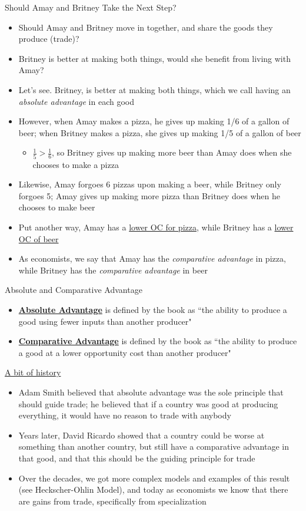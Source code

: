 \documentclass[10pt,xcolor={svgnames}]{beamer}
\begin{document}
\begin{frame}{Should Amay and Britney Take the Next Step?}
\begin{itemize}[<+->]
    \item Should Amay and Britney move in together, and share the goods they produce (trade)?
    \item Britney is better at making both things, would she benefit from living with Amay?
    \item Let's see. Britney, is better at making both things, which we call having an \textit{absolute advantage} in each good 
    \item However, when Amay makes a pizza, he gives up making 1/6 of a gallon of beer; when Britney makes a pizza, she gives up making 1/5 of a gallon of beer
    \begin{itemize}
        \item $\frac{1}{5}>\frac{1}{6}$, so Britney gives up making more beer than Amay does when she chooses to make a pizza
    \end{itemize}
    \item Likewise, Amay forgoes 6 pizzas upon making a beer, while Britney only forgoes 5; Amay gives up making more pizza than Britney does when he chooses to make beer
    \item Put another way, Amay has a \underline{lower OC for pizza}, while Britney has a \underline{lower OC of beer}
    \item As economists, we say that Amay has the \textit{comparative advantage} in pizza, while Britney has the \textit{comparative advantage} in beer
\end{itemize}
\end{frame}

\begin{frame}{Absolute and Comparative Advantage}
\begin{itemize}[<+->]
    \item \underline{\textbf{Absolute Advantage}} is defined by the book as ``the ability to produce a good using fewer inputs than another producer"
    \item \underline{\textbf{Comparative Advantage}} is defined by the book as ``the ability to produce a good at a lower opportunity cost than another producer"
\end{itemize}
    \underline{A bit of history} 
\begin{itemize}
    \item Adam Smith believed that absolute advantage was the sole principle that should guide trade; he believed that if a country was good at producing everything, it would have no reason to trade with anybody
    \item Years later, David Ricardo showed that a country could be worse at something than another country, but still have a comparative advantage in that good, and that this should be the guiding principle for trade
    \item Over the decades, we got more complex models and examples of this result (see Heckscher-Ohlin Model), and today as economists we know that there are gains from trade, specifically from specialization
\end{itemize}
\end{frame}
\end{document}
